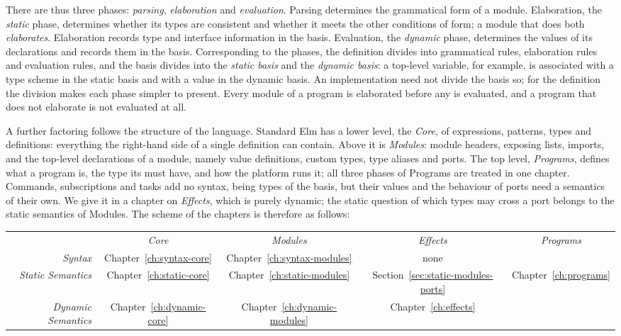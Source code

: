 There are thus three phases: \emph{parsing}, \emph{elaboration} and
\emph{evaluation}. Parsing determines the grammatical form of a module.
Elaboration, the \emph{static} phase, determines whether its types are
consistent and whether it meets the other conditions of form; a module that
does both \emph{elaborates}. Elaboration records type and interface information in the
basis. Evaluation, the \emph{dynamic} phase, determines the values of its
declarations and records them in the basis. Corresponding to the phases,
the definition divides into grammatical rules, elaboration rules and
evaluation rules, and the basis divides into the \emph{static basis} and the
\emph{dynamic basis}: a top-level variable, for example, is associated with a
type scheme in the static basis and with a value in the dynamic basis. An
implementation need not divide the basis so; for the definition the
division makes each phase simpler to present. Every module of a program is
elaborated before any is evaluated, and a program that does not elaborate
is not evaluated at all.

A further factoring follows the structure of the language. Standard Elm has
a lower level, the \emph{Core}, of expressions, patterns, types and
 definitions: everything the right-hand side of a single definition
can contain. Above it is \emph{Modules}: module headers, exposing lists,
imports, and the top-level declarations of a module, namely value
definitions, custom types, type aliases and ports. The top level,
\emph{Programs}, defines what a program is, the type its  must
have, and how the platform runs it; all three phases of Programs are treated
in one chapter. Commands, subscriptions and tasks add no syntax, being types
of the basis, but their values and the behaviour of ports need a semantics
of their own. We give it in a chapter on \emph{Effects}, which is purely
dynamic; the static question of which types may cross a port belongs to the
static semantics of Modules. %
The scheme of the chapters is therefore as follows:
\begin{center}
\setlength{\tabcolsep}{4pt}%
\begin{tabular}{r|c|c|c|c|}
  \multicolumn{1}{r}{}
  & \multicolumn{1}{c}{\emph{Core}}
  & \multicolumn{1}{c}{\emph{Modules}}
  & \multicolumn{1}{c}{\emph{Effects}}
  & \multicolumn{1}{c}{\emph{Programs}}\\
  \cline{2-5}
  \emph{Syntax}
  & Chapter~\ref{ch:syntax-core}
  & Chapter~\ref{ch:syntax-modules}
  & none
  & \\
  \cline{2-4}
  \emph{Static Semantics}
  & Chapter~\ref{ch:static-core}
  & Chapter~\ref{ch:static-modules}
  & Section~\ref{sec:static-modules-ports}
  & Chapter~\ref{ch:programs}\\
  \cline{2-4}
  \emph{Dynamic Semantics}
  & Chapter~\ref{ch:dynamic-core}
  & Chapter~\ref{ch:dynamic-modules}
  & Chapter~\ref{ch:effects}
  & \\
  \cline{2-5}
\end{tabular}
\end{center}


